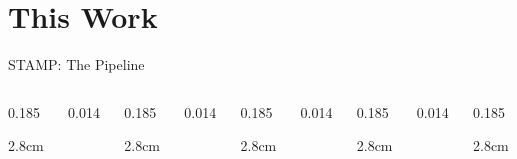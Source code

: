 \documentclass[aspectratio=169,10pt]{beamer}
\begin{document}
\section{This Work}
\begin{frame}{STAMP: The Pipeline}
  \begin{columns}[T]
    \begin{column}{0.185\textwidth}\begin{cardh}{2.8cm}\end{cardh}\end{column}
    \begin{column}{0.014\textwidth}\vspace{12mm}\centering{\color{Steel}$\to$}\end{column}
    \begin{column}{0.185\textwidth}\begin{cardh}{2.8cm}\end{cardh}\end{column}
    \begin{column}{0.014\textwidth}\vspace{12mm}\centering{\color{Steel}$\to$}\end{column}
    \begin{column}{0.185\textwidth}\begin{cardh}{2.8cm}\end{cardh}\end{column}
    \begin{column}{0.014\textwidth}\vspace{12mm}\centering{\color{Steel}$\to$}\end{column}
    \begin{column}{0.185\textwidth}\begin{cardh}{2.8cm}\end{cardh}\end{column}
    \begin{column}{0.014\textwidth}\vspace{12mm}\centering{\color{Steel}$\to$}\end{column}
    \begin{column}{0.185\textwidth}\begin{cardh}{2.8cm}\end{cardh}\end{column}

\end{columns}
\end{frame}
\end{document}
